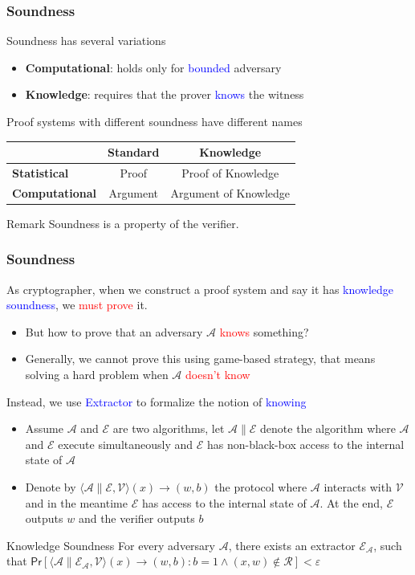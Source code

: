 \documentclass[handout]{beamer} %
\newcommand{\blue}[1]{\textcolor{blue}{#1}}
\newcommand{\dgreen}[1]{\textcolor{dgreen}{#1}}
\newcommand{\red}[1]{\textcolor{red}{#1}}
\begin{document}
\frame
{
  \frametitle{Soundness}
  \onslide<+-> Soundness has several variations
  \begin{itemize}
    \item<+-> \textbf{Computational}: holds only for \blue{bounded} adversary
    \item<+-> \textbf{Knowledge}: requires that the prover \blue{knows} the witness
  \end{itemize}
  \onslide<+->Proof systems with different soundness have different names
  \onslide<+->\begin{table}[tb]
    \centering

    \begin{tabular}{l|cc}
    \hline

    \hline
     & \textbf{Standard} & \textbf{Knowledge} \\
    \hline
      \textbf{Statistical}   & Proof & Proof of Knowledge \\
      \textbf{Computational} & Argument & Argument of Knowledge \\
    \hline

    \hline
    \end{tabular}
  \end{table}

  \onslide<+->\begin{block}{Remark}
  Soundness is a property of the verifier.
  \end{block}
}

\frame
{
  \frametitle{Soundness}
  \onslide<+->As cryptographer, when we construct a proof system and say it has \blue{knowledge soundness}, we \red{must prove} it.
  \begin{itemize}
    \item<+->But how to prove that an adversary $\mathcal{A}$ \red{knows} something?
    \item<+->Generally, we cannot prove this using game-based strategy, that means solving a hard problem when $\mathcal{A}$ \red{doesn't know}
  \end{itemize}
  \onslide<+->Instead, we use \blue{Extractor} to formalize the notion of \blue{knowing}
  \begin{itemize}
    \item<+-> Assume $\mathcal{A}$ and $\mathcal{E}$ are two algorithms, let $\mathcal{A}\|\mathcal{E}$ denote the algorithm where $\mathcal{A}$ and $\mathcal{E}$ execute simultaneously and $\mathcal{E}$ has \dgreen{non-black-box} access to the internal state of $\mathcal{A}$
    \item<+-> Denote by $\langle\mathcal{A}\|\mathcal{E},\mathcal{V}\rangle(x)\to(w,b)$ the protocol where $\mathcal{A}$ interacts with $\mathcal{V}$ and in the meantime $\mathcal{E}$ has access to the internal state of $\mathcal{A}$. At the end, $\mathcal{E}$ outputs $w$ and the verifier outputs $b$
  \end{itemize}
  \onslide<+->\begin{block}{Knowledge Soundness}
  For every adversary $\mathcal{A}$, there exists an extractor $\mathcal{E}_{\mathcal{A}}$, such that $\mathsf{Pr}[\langle\mathcal{A}\|\mathcal{E}_{\mathcal{A}},\mathcal{V}\rangle(x)\to(w,b):b=1\wedge (x,w)\notin\mathcal{R}]<\varepsilon$
  \end{block}
}
\end{document}

